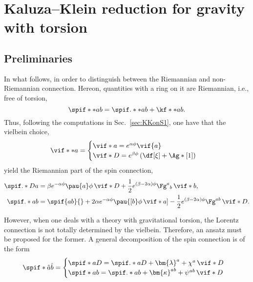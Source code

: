 \chapter{Kaluza--Klein reduction for gravity with torsion}

\section{Preliminaries}


In what follows, in order to distinguish between the Riemannian and non-Riemannian connection. Hereon, quantities with a ring on it are Riemannian, i.e., free of torsion,
\begin{equation*}
  \spif**{a}{b} = \spif.**{a}{b} + \kf**{a}{b}.
\end{equation*}
Thus, following the computations in Sec.~\ref{sec:KKonS1}, one have that the vielbein choice,
\begin{equation*}
  \vif**{a} = 
  \begin{cases}
    \vif*{a} = e^{\alpha\phi} \vif{a}\\
    \vif*{D} = e^{\beta\phi} \left( \df[\xi] + \Ag*[1] \right)
  \end{cases}
\end{equation*}
yield the Riemannian part of the spin connection,
\begin{align}
  \spif.*{Da}{} &= \beta e^{-\alpha \phi} \pau{a} \phi \, \vif*{D} + \frac{1}{2} e^{(\beta - 2\alpha) \phi} \Fg^{a}{}_{b} \, \vif*{b}, \\
  \spif.*{ab}{} &= \spif{ab}{} + 2 \alpha e^{ - \alpha \phi } \pau{[b} \phi \, \vif*{a]} - \frac{1}{2} e^{(\beta - 2\alpha) \phi} \Fg^{a b} \, \vif*{D}.
\end{align}

However, when one deals with a theory with gravitational torsion, the Lorentz connection is not totally determined by the vielbein. Therefore, an ansatz must be proposed for the former. A general decomposition of the spin connection is of the form
\begin{equation}
  \spif*{ \hat{a} \hat{b}}{} = 
  \begin{cases}
    \spif*{a D}{} = \spif.*{a D}{} + \bm{\lambda}^a  + \chi^a \, \vif*{D} \\
    \spif*{a b}{} = \spif.*{ab}{}  + \bm{\kappa}^{ab} + \psi^{ab} \, \vif*{D}
  \end{cases}
\end{equation}

